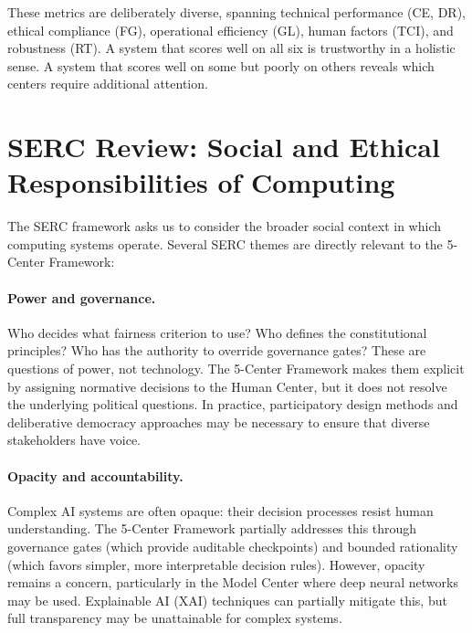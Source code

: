\documentclass[11pt,a4paper]{article}
\begin{document}
These metrics are deliberately diverse, spanning technical performance (CE, DR), ethical compliance (FG), operational efficiency (GL), human factors (TCI), and robustness (RT). A system that scores well on all six is trustworthy in a holistic sense. A system that scores well on some but poorly on others reveals which centers require additional attention.

\section{SERC Review: Social and Ethical Responsibilities of Computing}
\label{sec:serc}

The SERC framework asks us to consider the broader social context in which computing systems operate. Several SERC themes are directly relevant to the 5-Center Framework:

\paragraph{Power and governance.} Who decides what fairness criterion to use? Who defines the constitutional principles? Who has the authority to override governance gates? These are questions of power, not technology. The 5-Center Framework makes them explicit by assigning normative decisions to the Human Center, but it does not resolve the underlying political questions. In practice, participatory design methods \citep{schuler1993participatory} and deliberative democracy approaches may be necessary to ensure that diverse stakeholders have voice.

\paragraph{Opacity and accountability.} Complex AI systems are often opaque: their decision processes resist human understanding. The 5-Center Framework partially addresses this through governance gates (which provide auditable checkpoints) and bounded rationality (which favors simpler, more interpretable decision rules). However, opacity remains a concern, particularly in the Model Center where deep neural networks may be used. Explainable AI (XAI) techniques \citep{ribeiro2016should,lundberg2017unified} can partially mitigate this, but full transparency may be unattainable for complex systems.
\end{document}
